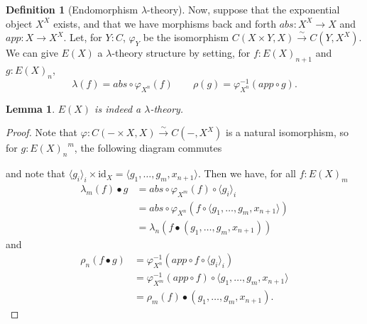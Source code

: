 \documentclass[a4paper]{amsbook}
\newtheorem{lemma}{Lemma}
\theoremstyle{definition}
\newtheorem{definition}{Definition}
\theoremstyle{remark}
\newcommand{\id}[1]{\ensuremath{\text{id}_{#1}}}
\begin{document}
  \begin{definition}[Endomorphism $ \lambda $-theory]
    Now, suppose that the exponential object $ X^X $ exists, and that we have morphisms back and forth $ abs: X^X \to X $ and $ app: X \to X^X $. Let, for $ Y: C $, $ \varphi_Y $ be the isomorphism $ C(X \times Y, X) \xrightarrow{\sim} C(Y, X^X) $.
    We can give $ E(X) $ a $ \lambda $-theory structure by setting, for $ f: E(X)_{n + 1} $ and $ g: E(X)_n $,
    \[ \lambda(f) = abs \circ \varphi_{X^n}(f) \qquad \rho(g) = \varphi_{X^n}^{-1}(app \circ g). \]
  \end{definition}

  \begin{lemma}
    $ E(X) $ is indeed a $ \lambda $-theory.
  \end{lemma}
  \begin{proof}
    Note that $ \varphi: C(- \times X, X) \xrightarrow{\sim} C(-, X^X) $ is a natural isomorphism, so for $ g: {E(X)_n}^m $, the following diagram commutes
    \begin{center}
    \end{center}
    and note that $ \langle g_i \rangle_i \times \id X = \langle g_1, \dots, g_m, x_{n + 1} \rangle $. Then we have, for all $ f: E(X)_m $
    \begin{align*}
      \lambda_m(f) \bullet g &= abs \circ \varphi_{X^m}(f) \circ \langle g_i \rangle_i\\
      &= abs \circ \varphi_{X^n}(f \circ \langle g_1, \dots, g_m, x_{n + 1} \rangle)\\
      &= \lambda_n(f \bullet (g_1, \dots, g_m, x_{n + 1}))
    \end{align*}
    and
    \begin{align*}
      \rho_n(f \bullet g) &= \varphi_{X^n}^{-1}(app \circ f \circ \langle g_i \rangle_i)\\
      &= \varphi_{X^m}^{-1}(app \circ f) \circ \langle g_1, \dots, g_m, x_{n + 1} \rangle\\
      &= \rho_m(f) \bullet (g_1, \dots, g_m, x_{n + 1}).
    \end{align*}
  \end{proof}
\end{document}
